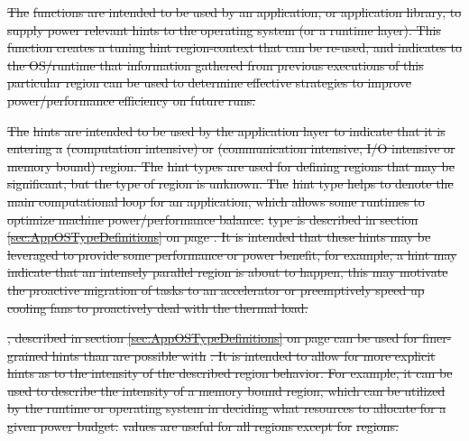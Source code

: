 \documentclass[12pt]{report} %
\providecommand{\DIFdeltex}[1]{{\protect\color{red}\sout{#1}}}                      %
\providecommand{\DIFdel}[1]{\texorpdfstring{\DIFdeltex{#1}}{}} %
\begin{document}


\DIFdel{The }%
\DIFdel{functions are intended to be used by an application, 
or application library, to supply power relevant hints to the operating system (or a runtime layer). 
This function creates a tuning hint region-context that can be re-used, and indicates to the OS/runtime that
information gathered from previous executions of this particular region can be used to determine effective strategies to improve
power/performance efficiency on future runs.
}%

\DIFdel{The }%
\DIFdel{hints are intended to be used by the application layer to indicate that it is 
entering a }%
\DIFdel{(computation intensive) or }%
\DIFdel{(communication intensive, I/O intensive or memory bound) region. The
}%
\DIFdel{hint types are used for defining regions that may be significant, but the type of region is unknown.
The }%
\DIFdel{hint type helps to denote the main computational loop for an application, which allows some
runtimes to optimize machine power/performance balance.
}%
\DIFdel{type is described in section \ref{sec:AppOSTypeDefinitions} on page \pageref{type:RegionHint}.
It is intended that these hints may be leveraged to provide some performance or power benefit, for example, a 
hint may indicate that an intensely parallel region is about to happen, this may motivate the proactive migration
of tasks to an accelerator or preemptively speed up cooling fans to proactively deal with the thermal load.
}%

\DIFdel{, described in section \ref{sec:AppOSTypeDefinitions} on page 
\pageref{type:RegionIntensity} can be used for finer-grained hints than are possible with }%
\DIFdel{.
It is intended to allow for more explicit hints as to the intensity of the described region behavior. For example, 
it can be used to describe the intensity of a memory bound region, which can be utilized by the runtime or 
operating system in deciding what resources to allocate for a given power budget. }%
\DIFdel{values
are useful for all regions except for }%
\DIFdel{regions.
 }%
\end{document}
